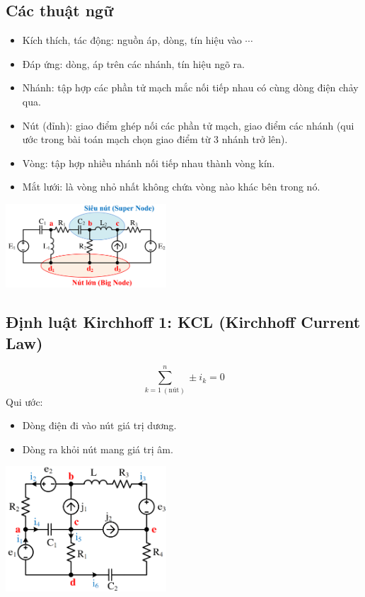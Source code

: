 \subsection{Các thuật ngữ}
\begin{itemize}
  \item Kích thích, tác động: nguồn áp, dòng, tín hiệu vào $\cdots$
  \item Đáp ứng: dòng, áp trên các nhánh, tín hiệu ngõ ra.
  \item Nhánh: tập hợp các phần tử mạch mắc nối tiếp nhau có cùng dòng điện chảy qua.
  \item Nút (đỉnh): giao điểm ghép nối các phần tử mạch, giao điểm các nhánh (qui ước trong bài toán mạch chọn giao điểm từ 3 nhánh trở lên).
  \item Vòng: tập hợp nhiều nhánh nối tiếp nhau thành vòng kín.
  \item Mắt lưới: là vòng nhỏ nhất không chứa vòng nào khác bên trong nó.
\end{itemize}
\begin{center}
  \includegraphics[width = 0.45\textwidth]{./image/15.png}
\end{center}
\subsection{Định luật Kirchhoff 1: KCL (Kirchhoff Current Law)} 
\begin{equation}
  \sum_{k=1 \ (\text{nút})}^{n} \pm i_k = 0
\end{equation}
Qui ước:
\begin{itemize}
  \item Dòng điện đi vào nút giá trị dương.
  \item Dòng ra khỏi nút mang giá trị âm.
\end{itemize}
\begin{center}
  \includegraphics[width = 0.45\textwidth]{./image/16.png}
\end{center}
